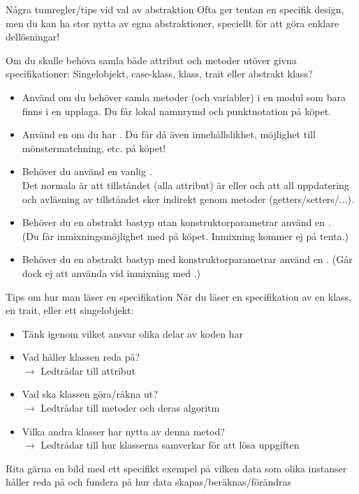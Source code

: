 \begin{Slide}{Några tumregler/tips vid val av abstraktion}\SlideFontSmall
Ofta ger tentan en specifik design, men du kan ha stor nytta av egna abstraktioner, speciellt  för att göra enklare dellösningar!

\pause\vspace{1em}Om du skulle behöva samla både attribut och metoder utöver givna specifikationer:
Singelobjekt, case-klass, klass, trait eller abstrakt klass?
\begin{itemize}\SlideFontTiny
\item Använd  om du behöver samla metoder (och variabler) i en modul som bara finns i en upplaga. Du får lokal namnrymd och punktnotation på köpet.
\item Använd en  om du har . Du får då även innehållslikhet, möjlighet till mönstermatchning, etc. på köpet!
\item Behöver du  använd en vanlig .\\ Det normala är att tillståndet (alla attribut) är  eller  och att all uppdatering och avläsning av tillståndet sker indirekt genom metoder (getters/setters/...).
\item Behöver du en abstrakt bastyp utan konstruktorparametrar använd en . \\(Du får inmixningsmöjlighet med  på köpet. Inmixning kommer ej på tenta.)
\item Behöver du en abstrakt bastyp med konstruktorparametrar använd en . (Går dock ej att använda vid inmixning med .)
\end{itemize}
\end{Slide}


\begin{Slide}{Tips om hur man läser en specifikation}\SlideFontSmall
När du läser en specifikation av en klass, en trait, eller ett singelobjekt:
\begin{itemize}
\item Tänk igenom vilket ansvar olika delar av koden har
\item Vad håller klassen reda på? \\$\rightarrow$ Ledtrådar till attribut
\item Vad ska klassen göra/räkna ut? \\$\rightarrow$ Ledtrådar till metoder och deras algoritm
\item Vilka andra klasser har nytta av denna metod? \\$\rightarrow$ Ledtrådar till hur klasserna samverkar för att lösa uppgiften
\end{itemize}
Rita gärna en bild med ett specifikt exempel på vilken data som olika instanser håller reda på och fundera på hur data skapas/beräknas/förändras
\end{Slide}


